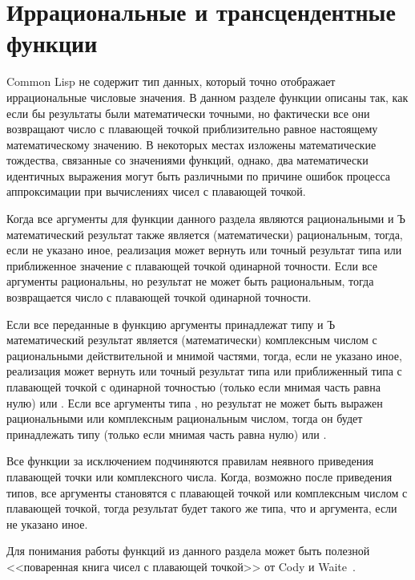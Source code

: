 \section{Иррациональные и трансцендентные функции}
\label{TRANSCENDENTAL-SECTION}

Common Lisp не содержит тип данных, который точно отображает иррациональные
числовые значения.
В данном разделе функции описаны так, как если бы результаты были математически
точными, но фактически все они возвращают число с плавающей точкой
приблизительно равное настоящему математическому значению.
В некоторых местах изложены математические тождества, связанные со значениями
функций, однако, два математически идентичных выражения могут быть различными
по причине ошибок процесса аппроксимации при вычислениях чисел с плавающей
точкой.

Когда все аргументы для функции данного раздела являются рациональными и Ъ
математический результат также является (математически) рациональным, тогда,
если не указано иное, реализация может вернуть или точный результат типа
 или приближенное значение с плавающей точкой одинарной точности.
Если все аргументы рациональны, но результат не может быть рациональным, тогда
возвращается число с плавающей точкой одинарной точности.

Если все переданные в функцию аргументы принадлежат типу  и Ъ математический результат является (математически)
комплексным числом с рациональными действительной и мнимой частями, тогда, если
не указано иное, реализация может вернуть или точный результат типа  или приближенный типа с плавающей точкой с
одинарной точностью  (только если мнимая часть равна нулю) или 
 .
Если все аргументы типа , но результат не
может быть выражен рациональными или комплексным рациональным числом, тогда он
будет принадлежать типу  (только если мнимая часть равна нулю)
или .

Все функции за исключением  подчиняются правилам неявного приведения
плавающей точки или комплексного числа. Когда, возможно после приведения типов,
все аргументы становятся с плавающей точкой или комплексным числом с плавающей
точкой, тогда результат будет такого же типа, что и аргумента, если не указано
иное.

\beforenoterule
\begin{implementation}
Для понимания работы функций из данного раздела может быть полезной <<поваренная
книга чисел с плавающей точкой>> от Cody и Waite~\cite{CODY-AND-WAITE}.
\end{implementation}
\afternoterule

